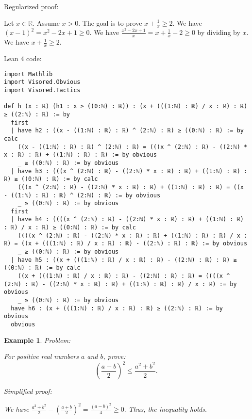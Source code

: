 \documentclass{article}
\newtheorem{example}{Example}
\begin{document}
Regularized proof:
\begin{tcolorbox}[colback=red!10, width=\linewidth]
Let $x\in\mathbb{R}$. Assume $x>0$.
The goal is to prove $x + \frac{1}{x} \ge 2$.
We have ${\left(x-1\right)}^2 = x^2 - 2x + 1 \ge 0$.
We have $\frac{x^2 - 2x + 1}{x} = x + \frac{1}{x} - 2 \ge 0$ by dividing by $x$.
We have $x + \frac{1}{x} \ge 2$.
\end{tcolorbox}

Lean 4 code:
\begin{tcolorbox}[colback=white!10, width=\linewidth]
\begin{lstlisting}[language=Lean4]
import Mathlib
import Visored.Obvious
import Visored.Tactics

def h (x : ℝ) (h1 : x > ((0:ℕ) : ℝ)) : (x + (((1:ℕ) : ℝ) / x : ℝ) : ℝ) ≥ ((2:ℕ) : ℝ) := by
  first
  | have h2 : ((x - ((1:ℕ) : ℝ) : ℝ) ^ (2:ℕ) : ℝ) ≥ ((0:ℕ) : ℝ) := by calc
    ((x - ((1:ℕ) : ℝ) : ℝ) ^ (2:ℕ) : ℝ) = (((x ^ (2:ℕ) : ℝ) - ((2:ℕ) * x : ℝ) : ℝ) + ((1:ℕ) : ℝ) : ℝ) := by obvious
    _ ≥ ((0:ℕ) : ℝ) := by obvious
  | have h3 : (((x ^ (2:ℕ) : ℝ) - ((2:ℕ) * x : ℝ) : ℝ) + ((1:ℕ) : ℝ) : ℝ) ≥ ((0:ℕ) : ℝ) := by calc
    (((x ^ (2:ℕ) : ℝ) - ((2:ℕ) * x : ℝ) : ℝ) + ((1:ℕ) : ℝ) : ℝ) = ((x - ((1:ℕ) : ℝ) : ℝ) ^ (2:ℕ) : ℝ) := by obvious
    _ ≥ ((0:ℕ) : ℝ) := by obvious
  first
  | have h4 : ((((x ^ (2:ℕ) : ℝ) - ((2:ℕ) * x : ℝ) : ℝ) + ((1:ℕ) : ℝ) : ℝ) / x : ℝ) ≥ ((0:ℕ) : ℝ) := by calc
    ((((x ^ (2:ℕ) : ℝ) - ((2:ℕ) * x : ℝ) : ℝ) + ((1:ℕ) : ℝ) : ℝ) / x : ℝ) = ((x + (((1:ℕ) : ℝ) / x : ℝ) : ℝ) - ((2:ℕ) : ℝ) : ℝ) := by obvious
    _ ≥ ((0:ℕ) : ℝ) := by obvious
  | have h5 : ((x + (((1:ℕ) : ℝ) / x : ℝ) : ℝ) - ((2:ℕ) : ℝ) : ℝ) ≥ ((0:ℕ) : ℝ) := by calc
    ((x + (((1:ℕ) : ℝ) / x : ℝ) : ℝ) - ((2:ℕ) : ℝ) : ℝ) = ((((x ^ (2:ℕ) : ℝ) - ((2:ℕ) * x : ℝ) : ℝ) + ((1:ℕ) : ℝ) : ℝ) / x : ℝ) := by obvious
    _ ≥ ((0:ℕ) : ℝ) := by obvious
  have h6 : (x + (((1:ℕ) : ℝ) / x : ℝ) : ℝ) ≥ ((2:ℕ) : ℝ) := by obvious
  obvious

\end{lstlisting}
\end{tcolorbox}


\begin{example}
Problem:
\begin{tcolorbox}[colback=yellow!10, width=\linewidth]
For positive real numbers $a$ and $b$, prove:
    $$\left(\frac{a+b}{2}\right)^2 \leq \frac{a^2+b^2}{2}.$$
\end{tcolorbox}

Simplified proof:
\begin{tcolorbox}[colback=blue!10, width=\linewidth]
We have
$ \frac{a^2+b^2}{2} - \left(\frac{a+b}{2}\right)^2 = \frac{(a-b)^2}{4} \ge 0. $
Thus, the inequality holds.
\end{tcolorbox}
\end{example}
\end{document}

